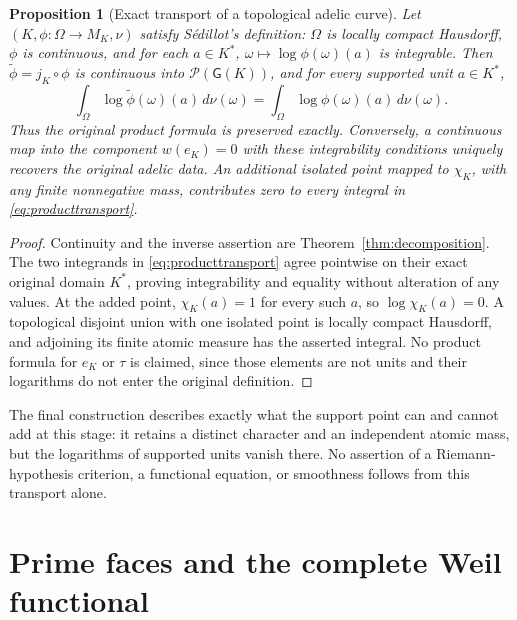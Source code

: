 \documentclass[11pt,a4paper]{article}
\newtheorem{proposition}[theorem]{Proposition}
\theoremstyle{definition}\newtheorem{definition}[theorem]{Definition}
\newcommand{\G}{\mathsf G}\newcommand{\Tor}{\operatorname{Tor}}\newcommand{\Frac}{\operatorname{Frac}}
\begin{document}
\begin{proposition}[Exact transport of a topological adelic curve]
\label{prop:adelictransport}
Let $(K,\phi:\Omega\to M_K,\nu)$ satisfy S\'edillot's definition:
$\Omega$ is locally compact Hausdorff, $\phi$ is continuous, and for
each $a\in K^*$, $\omega\mapsto\log\phi(\omega)(a)$ is integrable.
Then $\widetilde\phi=j_K\circ\phi$ is continuous into
$\mathcal P(\G(K))$, and for every supported unit $a\in K^*$,
\[
 \int_\Omega\log\widetilde\phi(\omega)(a)\,d\nu(\omega)
 =\int_\Omega\log\phi(\omega)(a)\,d\nu(\omega).
 \tag{AV8.1}\label{eq:producttransport}
\]
Thus the original product formula is preserved exactly. Conversely,
a continuous map into the component $w(e_K)=0$ with these integrability
conditions uniquely recovers the original adelic data. An additional
isolated point mapped to $\chi_K$, with any finite nonnegative mass,
contributes zero to every integral in \eqref{eq:producttransport}.
\end{proposition}
\begin{proof}
Continuity and the inverse assertion are
Theorem~\ref{thm:decomposition}. The two integrands in
\eqref{eq:producttransport} agree pointwise on their exact original
domain $K^*$, proving integrability and equality without alteration of
any values. At the added point, $\chi_K(a)=1$ for every such $a$, so
$\log\chi_K(a)=0$. A topological disjoint union with one isolated point
is locally compact Hausdorff, and adjoining its finite atomic measure
has the asserted integral. No product formula for $e_K$ or $\tau$ is
claimed, since those elements are not units and their logarithms do
not enter the original definition.
\end{proof}

The final construction describes exactly what the support point can
and cannot add at this stage: it retains a distinct character and an
independent atomic mass, but the logarithms of supported units vanish
there. No assertion of a Riemann-hypothesis criterion, a functional
equation, or smoothness follows from this transport alone.


\section{Prime faces and the complete Weil functional}
\label{sec:prime-faces-weil}
\end{document}
